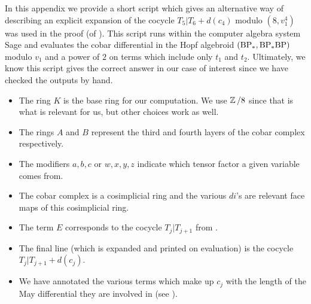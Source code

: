 In this appendix we provide a short script which gives an alternative way of describing an explicit expansion of the cocycle $T_5|T_{6} + d(c_4)$ modulo $(8,v_1^4)$ was used in the proof (of ).
This script runs within the computer algebra system Sage and
evaluates the cobar differential in the Hopf algebroid $(\mathrm{BP}_*, \mathrm{BP}_*\mathrm{BP})$ modulo $v_1$ and a power of $2$ on terms which include only $t_1$ and $t_2$.
Ultimately, we know this script gives the correct answer in our case of interest since we have checked the outputs by hand.

\begin{itemize}
\item The ring $K$ is the base ring for our computation. We use $\operatorname{\mathbb{Z}}/8$ since that is what is relevant for us, but other choices work as well.
\item The rings $A$ and $B$ represent the third and fourth layers of the cobar complex respectively.
\item The modifiers $a,b,c$ or $w,x,y,z$ indicate which tensor factor a given variable comes from.
\item The cobar complex is a cosimplicial ring and the various $di$'s are relevant face maps of this cosimplicial ring.
\item The term $E$ corresponds to the cocycle $T_j|T_{j+1}$ from .
\item The final line (which is expanded and printed on evaluation) is the cocycle $T_j|T_{j+1} + d(c_j)$. \item We have annotated the various terms which make up $c_j$ with the length of the May differential they are involved in (see ).
\end{itemize}





